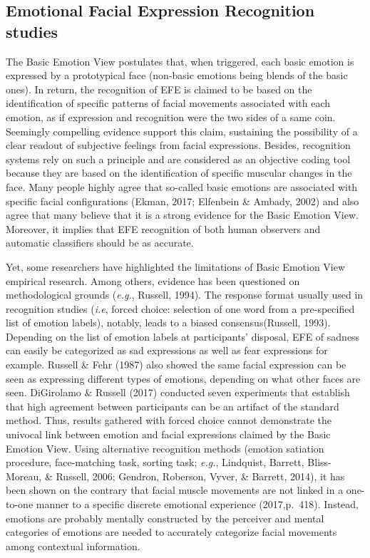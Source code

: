 \documentclass[man]{apa6}
\begin{document}
\hypertarget{emotional-facial-expression-recognition-studies}{%
\subsection{Emotional Facial Expression Recognition studies}\label{emotional-facial-expression-recognition-studies}}

The Basic Emotion View postulates that, when triggered, each basic emotion is expressed by a prototypical face (non-basic emotions being blends of the basic ones). In return, the recognition of EFE is claimed to be based on the identification of specific patterns of facial movements associated with each emotion, as if expression and recognition were the two sides of a same coin. Seemingly compelling evidence support this claim, sustaining the possibility of a clear readout of subjective feelings from facial expressions. Besides, recognition systems rely on such a principle and are considered as an objective coding tool because they are based on the identification of specific muscular changes in the face. Many people highly agree that so-called basic emotions are associated with specific facial configurations (Ekman, 2017; Elfenbein \& Ambady, 2002) and also agree that many believe that it is a strong evidence for the Basic Emotion View. Moreover, it implies that EFE recognition of both human observers and automatic classifiers should be as accurate.

Yet, some researchers have highlighted the limitations of Basic Emotion View empirical research. Among others, evidence has been questioned on methodological grounds (\emph{e.g.}, Russell, 1994). The response format usually used in recognition studies (\emph{i.e}, forced choice: selection of one word from a pre-specified list of emotion labels), notably, leads to a biased consensus(Russell, 1993). Depending on the list of emotion labels at participants' disposal, EFE of sadness can easily be categorized as sad expressions as well as fear expressions for example. Russell \& Fehr (1987) also showed the same facial expression can be seen as expressing different types of emotions, depending on what other faces are seen. DiGirolamo \& Russell (2017) conducted seven experiments that establish that high agreement between participants can be an artifact of the standard method. Thus, results gathered with forced choice cannot demonstrate the univocal link between emotion and facial expressions claimed by the Basic Emotion View. Using alternative recognition methods (emotion satiation procedure, face-matching task, sorting task; \emph{e.g.}, Lindquist, Barrett, Bliss-Moreau, \& Russell, 2006; Gendron, Roberson, Vyver, \& Barrett, 2014), it has been shown on the contrary that facial muscle movements are not linked in a one-to-one manner to a specific discrete emotional experience (2017,p.~418). Instead, emotions are probably mentally constructed by the perceiver and mental categories of emotions are needed to accurately categorize facial movements among contextual information.
\end{document}
